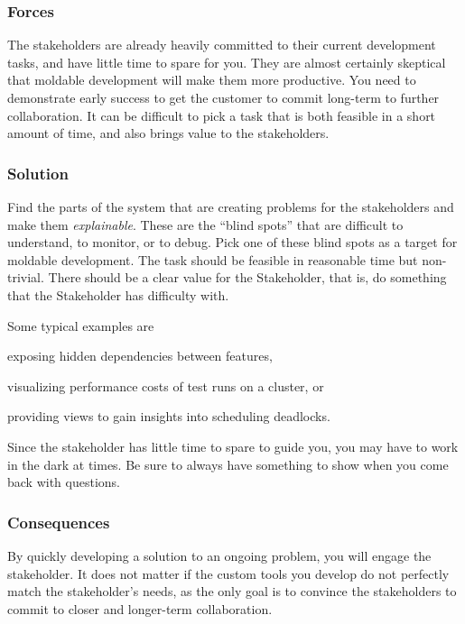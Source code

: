\documentclass[sigconf]{acmart}
\begin{document}
\subsubsection*{Forces}
The stakeholders are already heavily committed to their current development tasks, and have little time to spare for you.
They are almost certainly skeptical that moldable development will make them more productive.
You need to demonstrate early success to get the customer to commit long-term to further collaboration.
It can be difficult to pick a task that is both feasible in a short amount of time, and also brings value to the stakeholders.

\subsubsection*{Solution}
Find the parts of the system that are creating problems for the stakeholders and make them \emph{explainable}.
These are the ``blind spots'' that are difficult to understand, to monitor, or to debug.
Pick one of these blind spots as a target for moldable development.
The task should be feasible in reasonable time but non-trivial.
There should be a clear value for the Stakeholder, that is, do something that the Stakeholder has difficulty with.

Some typical examples are 
\begin{inparaenum}[(i)]
\item exposing hidden dependencies between features, 
\item visualizing performance costs of test runs on a cluster, or
\item providing views to gain insights into scheduling deadlocks.
\end{inparaenum}

Since the stakeholder has little time to spare to guide you, you may have to work in the dark at times.
Be sure to always have something to show when you come back with questions.

\subsubsection*{Consequences}
By quickly developing a solution to an ongoing problem, you will engage the stakeholder.
It does not matter if the custom tools you develop do not perfectly match the stakeholder's needs, as the only goal is to convince the stakeholders to commit to closer and longer-term collaboration.

\end{document}
